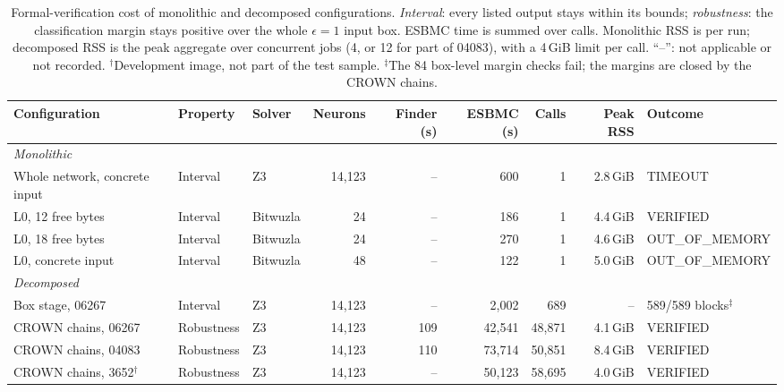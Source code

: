 \begin{table}[t]
\centering
\caption{Formal-verification cost of monolithic and decomposed configurations.
\emph{Interval}: every listed output stays within its bounds;
\emph{robustness}: the classification margin stays positive over the whole
$\epsilon=1$ input box. ESBMC time is summed over calls. Monolithic RSS is per
run; decomposed RSS is the peak aggregate over concurrent jobs (4, or 12 for part
of 04083), with a 4\,GiB limit per call. ``--'': not applicable or not recorded.
$^\dagger$Development image, not part of the test sample.
$^\ddagger$The 84 box-level margin checks fail; the margins are closed by the
CROWN chains.}
\label{tab:cost}
\scriptsize
\renewcommand{\arraystretch}{1.15}
\setlength{\tabcolsep}{5pt}
\begin{tabular}{lllrrrrrl}
\toprule
\textbf{Configuration} & \textbf{Property} & \textbf{Solver} & \textbf{Neurons} &
\textbf{Finder (s)} & \textbf{ESBMC (s)} & \textbf{Calls} & \textbf{Peak RSS} & \textbf{Outcome} \\
\midrule
\multicolumn{9}{l}{\textit{Monolithic}} \\
\addlinespace[1pt]
Whole network, concrete input  & Interval   & Z3       & 14,123 & -- & 600 & 1 & 2.8\,GiB & TIMEOUT \\
L0, 12 free bytes              & Interval   & Bitwuzla & 24     & -- & 186 & 1 & 4.4\,GiB & VERIFIED \\
L0, 18 free bytes              & Interval   & Bitwuzla & 24     & -- & 270 & 1 & 4.6\,GiB & OUT\_OF\_MEMORY \\
L0, concrete input             & Interval   & Bitwuzla & 48     & -- & 122 & 1 & 5.0\,GiB & OUT\_OF\_MEMORY \\
\midrule
\multicolumn{9}{l}{\textit{Decomposed}} \\
\addlinespace[1pt]
\quad Box stage, 06267         & Interval   & Z3 & 14,123 & --  & 2,002  & 689    & --       & 589/589 blocks$^\ddagger$ \\
CROWN chains, 06267            & Robustness & Z3 & 14,123 & 109 & 42,541 & 48,871 & 4.1\,GiB & VERIFIED \\
CROWN chains, 04083            & Robustness & Z3 & 14,123 & 110 & 73,714 & 50,851 & 8.4\,GiB & VERIFIED \\
CROWN chains, 3652$^\dagger$   & Robustness & Z3 & 14,123 & --  & 50,123 & 58,695 & 4.0\,GiB & VERIFIED \\
\bottomrule
\end{tabular}
\end{table}
